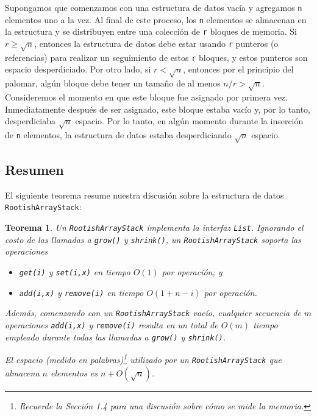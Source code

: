 \documentclass[11pt]{book}
\theoremstyle{plain}
\newtheorem{teorema}{Teorema}[chapter]
\begin{document}
Supongamos que comenzamos con una estructura de datos vacía y agregamos \texttt{n} elementos uno a la vez. Al final de este proceso, los \texttt{n} elementos se almacenan en la estructura y se distribuyen entre una colección de \texttt{r} bloques de memoria. Si $r \ge \sqrt{n}$, entonces la estructura de datos debe estar usando \texttt{r} punteros (o referencias) para realizar un seguimiento de estos \texttt{r} bloques, y estos punteros son espacio desperdiciado. Por otro lado, si $r < \sqrt{n}$, entonces por el principio del palomar, algún bloque debe tener un tamaño de al menos $n/r > \sqrt{n}$. Consideremos el momento en que este bloque fue asignado por primera vez. Inmediatamente después de ser asignado, este bloque estaba vacío y, por lo tanto, desperdiciaba $\sqrt{n}$ espacio. Por lo tanto, en algún momento durante la inserción de \texttt{n} elementos, la estructura de datos estaba desperdiciando $\sqrt{n}$ espacio.

\subsection{Resumen}

El siguiente teorema resume nuestra discusión sobre la estructura de datos \texttt{RootishArrayStack}:

\begin{teorema}
Un \texttt{RootishArrayStack} implementa la interfaz \texttt{List}. Ignorando el costo de las llamadas a \texttt{grow()} y \texttt{shrink()}, un \texttt{RootishArrayStack} soporta las operaciones

\begin{itemize}
    \item \texttt{get(i)} y \texttt{set(i,x)} en tiempo $O(1)$ por operación; y
    \item \texttt{add(i,x)} y \texttt{remove(i)} en tiempo $O(1 + n - i)$ por operación.
\end{itemize}

Además, comenzando con un \texttt{RootishArrayStack} vacío, cualquier secuencia de $m$ operaciones \texttt{add(i,x)} y \texttt{remove(i)} resulta en un total de $O(m)$ tiempo empleado durante todas las llamadas a \texttt{grow()} y \texttt{shrink()}.

El espacio (medido en palabras)\footnote{Recuerde la Sección 1.4 para una discusión sobre cómo se mide la memoria.} utilizado por un \texttt{RootishArrayStack} que almacena $n$ elementos es $n + O(\sqrt{n})$.
\end{teorema}
\end{document}
